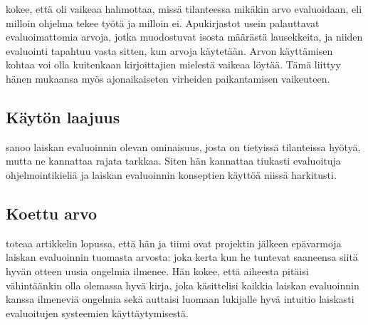 \citet{sampson2009experience} kokee, että oli vaikeaa hahmottaa, missä tilanteessa mikäkin arvo evaluoidaan, eli milloin ohjelma tekee työtä ja milloin ei. Apukirjastot usein palauttavat evaluoimattomia arvoja, jotka muodostuvat isosta määrästä lausekkeita, ja niiden evaluointi tapahtuu vasta sitten, kun arvoja käytetään. Arvon käyttämisen kohtaa voi olla kuitenkaan kirjoittajien mielestä vaikeaa löytää. Tämä liittyy hänen mukaansa myös ajonaikaiseten virheiden paikantamisen vaikeuteen.

\subsection{Käytön laajuus}
\citet{vesakarvonen} sanoo laiskan evaluoinnin olevan ominaisuus, josta on tietyissä tilanteissa hyötyä, mutta ne kannattaa rajata tarkkaa. Siten hän kannattaa tiukasti evaluoituja ohjelmointikieliä ja laiskan evaluoinnin konseptien käyttöä niissä harkitusti.

\subsection{Koettu arvo}

\citet{sampson2009experience} toteaa artikkelin lopussa, että hän ja tiimi ovat projektin jälkeen epävarmoja laiskan evaluoinnin tuomasta arvosta: joka kerta kun he tuntevat saaneensa siitä hyvän otteen uusia ongelmia ilmenee. Hän kokee, että aiheesta pitäisi vähintäänkin olla olemassa hyvä kirja, joka käsittelisi kaikkia laiskan evaluoinnin kanssa ilmeneviä ongelmia sekä auttaisi luomaan lukijalle hyvä intuitio laiskasti evaluoitujen systeemien käyttäytymisestä.
\clearpage

